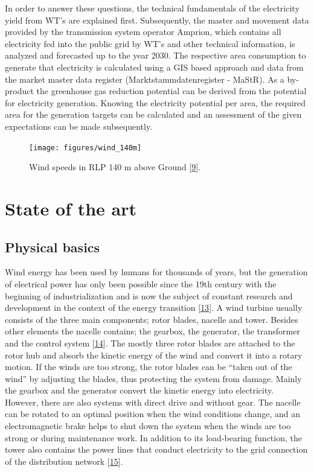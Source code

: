 \documentclass[a4paper,11pt]{article}
\begin{document}
In order to answer these questions, the technical fundamentals of the electricity yield from WT's are explained first. Subsequently, the master and movement data provided by the transmission system operator Amprion, which contains all electricity fed into the public grid by WT's and other technical information, is analyzed and forecasted up to the year 2030. The respective area consumption to generate that electricity is calculated using a GIS based approach and data from the market master data register (Marktstammdatenregister - MaStR). As a by-product the greenhouse gas reduction potential can be derived from the potential for electricity generation. Knowing the electricity potential per area, the required area for the generation targets can be calculated and an assessment of the given expectations can be made subsequently.


\begin{figure}[H]

{\centering \texttt{[image: figures/wind\_140m]} 

}

\caption{Wind speeds in RLP 140 m above Ground {[}\protect\hyperlink{ref-MinisteriumfurWirtschaftKlimaschutzEnergieundLandesplanung.2013}{9}{]}.}\label{fig:wind}
\end{figure}
\hypertarget{state-of-the-art}{%
\section{State of the art}\label{state-of-the-art}}

\hypertarget{physical-basics}{%
\subsection{Physical basics}\label{physical-basics}}

Wind energy has been used by humans for thousands of years, but the generation of electrical power has only been possible since the 19th century with the beginning of industrialization and is now the subject of constant research and development in the context of the energy transition {[}\protect\hyperlink{ref-Wikipedia.2021}{13}{]}. A wind turbine usually consists of the three main components; rotor blades, nacelle and tower. Besides other elements the nacelle contains; the gearbox, the generator, the transformer and the control system {[}\protect\hyperlink{ref-MladenBosnjakovic.2013}{14}{]}. The mostly three rotor blades are attached to the rotor hub and absorb the kinetic energy of the wind and convert it into a rotary motion. If the winds are too strong, the rotor blades can be ``taken out of the wind'' by adjusting the blades, thus protecting the system from damage. Mainly the gearbox and the generator convert the kinetic energy into electricity. However, there are also systems with direct drive and without gear. The nacelle can be rotated to an optimal position when the wind conditions change, and an electromagnetic brake helps to shut down the system when the winds are too strong or during maintenance work. In addition to its load-bearing function, the tower also contains the power lines that conduct electricity to the grid connection of the distribution network {[}\protect\hyperlink{ref-NetzKonstrukteur.16.11.2020}{15}{]}.
\end{document}
